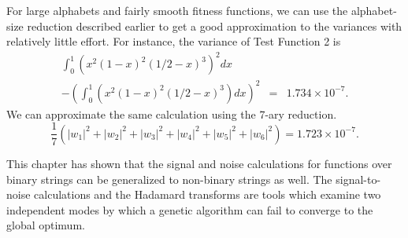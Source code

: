 For large alphabets
and fairly smooth fitness functions, we can use the alphabet-size reduction
described earlier to get a good approximation to the variances with
relatively little effort.  For instance, the variance of Test Function 2 is
\begin{eqnarray}
\int_0^1{(x^2 (1-x)^2 (1/2-x)^3)^2 dx}&&\nonumber\\
	-\left(\int_0^1{(x^2(1-x)^2(1/2-x)^3) dx}
	\right)^2&=&1.734\times 10^{-7}.
\end{eqnarray}
We can approximate the same calculation using the 7-ary reduction.
\begin{equation}
\frac{1}{7}(|w_1|^2+|w_2|^2+|w_3|^2+|w_4|^2+|w_5|^2+|w_6|^2)=1.723\times 10^{-7}.
\end{equation}

This chapter has shown that the signal and noise calculations for functions
over binary strings can be generalized to non-binary strings as well.
The signal-to-noise calculations and the Hadamard transforms 
are tools which examine two independent
modes by which a genetic algorithm can fail to converge to the global optimum.


